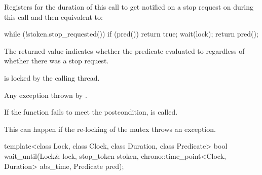 \begin{itemdescr}
\pnum
\effects
Registers for the duration of this call 
to get notified on a stop request on 
during this call and then equivalent to:
\begin{codeblock}
while (!stoken.stop_requested()) {
  if (pred())
    return true;
  wait(lock);
}
return pred();
\end{codeblock}

\pnum
\begin{note}
The returned value indicates whether the predicate evaluated to
 regardless of whether there was a stop request.
\end{note}

\pnum
\ensures
{} is locked by the calling thread.

\pnum
\throws
Any exception thrown by .

\pnum
\remarks
If the function fails to meet the postcondition,
 is called.
\begin{note}
This can happen if the re-locking of the mutex throws an exception.
\end{note}
\end{itemdescr}

\begin{itemdecl}
template<class Lock, class Clock, class Duration, class Predicate>
  bool wait_until(Lock& lock, stop_token stoken,
                  chrono::time_point<Clock, Duration> abs_time, Predicate pred);
\end{itemdecl}

